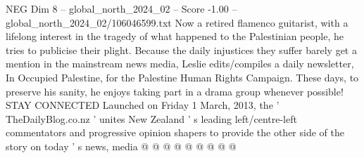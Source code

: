 \begin{textsample}{NEG Dim 8 – global\_north\_2024\_02 – Score -1.00 – global\_north\_2024\_02/106046599.txt}
Now a retired flamenco guitarist, with a lifelong interest in the tragedy of what happened to the Palestinian people, he tries to publicise their plight.
Because the daily injustices they suffer barely get a mention in the mainstream news media, Leslie edits/compiles a daily newsletter, In Occupied Palestine, for the Palestine Human Rights Campaign.
These days, to preserve his sanity, he enjoys taking part in a drama group whenever possible!
STAY CONNECTED Launched on Friday 1 March, 2013, the ' TheDailyBlog.co.nz ' unites New Zealand ' s leading left/centre-left commentators and progressive opinion shapers to provide the other side of the story on today ' s news, media @ @ @ @ @ @ @ @ @

\end{textsample}
